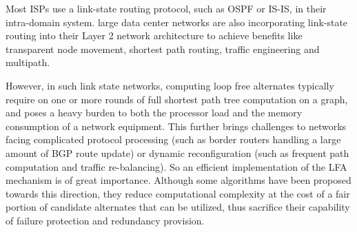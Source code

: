 Most ISPs use a link-state routing protocol, such as OSPF or IS-IS, in their intra-domain system.
large data center networks are also incorporating link-state routing into their Layer 2 network architecture \cite{perlman2011introduction, TRILL} 
to achieve benefits like transparent node movement, shortest path routing, traffic engineering and multipath.


However, in such link state networks, computing loop free alternates typically require on one or more rounds
of full shortest path tree computation on a graph, and poses a heavy burden to both the processor load and
the memory consumption of a network equipment. This further brings challenges to networks
facing complicated protocol processing (such as border routers handling a large amount of BGP route update)
or dynamic reconfiguration (such as frequent path computation and traffic re-balancing).
So an efficient implementation of the LFA mechanism is of great importance. Although some algorithms \cite{TBFH, Geng2018A}
have been proposed towards this direction, they reduce computational complexity at the cost of
a fair portion of candidate alternates that can be utilized, thus sacrifice their capability of failure protection and
redundancy provision.

